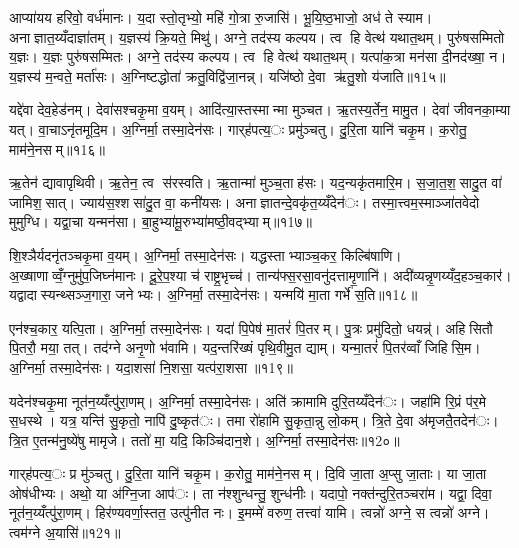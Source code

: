 आप्या॑यय हरिवो॒ वर्ध॑मानः। य॒दा स्तो॒तृभ्यो॒ महि॑ गो॒त्रा रु॒जासि॑। भू॒यि॒ष्ठ॒भाजो॒ अध॑ ते स्याम। अनाज्ञात॒य्यँदाज्ञा॑तम्। य॒ज्ञस्य॑ क्रि॒यते॒ मिथु॑। अग्ने॒ तद॑स्य कल्पय। त्व हि वेत्थ॑ यथात॒थम्। पुरु॑षसम्मितो य॒ज्ञः। य॒ज्ञः पुरु॑षसम्मितः। अग्ने॒ तद॑स्य कल्पय। त्व हि वेत्थ॑ यथात॒थम्। यत्पा॑क॒त्रा मन॑सा दी॒नद॑ख्षा॒ न। य॒ज्ञस्य॑ म॒न्वते॒ मर्ता॑सः। अ॒ग्निष्टद्धोता॑ क्रतु॒विद्वि॑जा॒नन्न्। यजि॑ष्ठो दे॒वा ऋ॑तु॒शो य॑जाति॥१1५॥


यद्दे॑वा देव॒हेड॑नम्। देवा॑सश्चकृ॒मा व॒यम्। आदि॑त्या॒स्तस्मान्मा मुञ्चत। ऋ॒तस्य॒र्तेन॒ मामु॒त। देवा॑ जीवनका॒म्या यत्। वा॒चाऽनृ॑तमूदि॒म। अ॒ग्निर्मा॒ तस्मा॒देन॑सः। गार्‌ह॑पत्य॒ः प्रमु॑ञ्चतु। दु॒रि॒ता यानि॑ चकृ॒म। क॒रोतु॒ माम॑ने॒नसम्॥१1६॥

ऋ॒तेन॑ द्यावापृथिवी। ऋ॒तेन॒ त्व स॑रस्वति। ऋ॒तान्मा॑ मुञ्च॒ताह॑सः। यद॒न्यकृ॑तमारि॒म। स॒जा॒त॒श॒सादु॒त वा॑ जामिश॒सात्। ज्याय॑स॒श्शसा॑दु॒त वा॒ कनी॑यसः। अनाज्ञातन्दे॒वकृ॑त॒य्यँदेन॑ः। तस्मा॒त्त्वम॒स्माञ्जा॑तवेदो मुमुग्धि। यद्वा॒चा यन्मन॑सा। बा॒हुभ्या॑मू॒रुभ्या॑मष्ठी॒वद्भ्याम्॥१1७॥

शि॒श्ञैर्यदनृ॑तञ्चकृ॒मा व॒यम्। अ॒ग्निर्मा॒ तस्मा॒देन॑सः। यद्धस्ताभ्याञ्च॒कर॒ किल्बि॑षाणि। अ॒ख्षाणाव्वँ॒ग्नुमु॑प॒जिघ्न॑मानः। दू॒रे॒प॒श्या च॑ राष्ट्र॒भृच्च॑। तान्य॑फ्स॒रसा॒वनु॑दत्तामृ॒णानि॑। अदी॑व्यन्नृ॒णय्यँद॒हञ्च॒कार॑। यद्वादास्यन्थ्सञ्ज॒गारा॒ जनेभ्यः। अ॒ग्निर्मा॒ तस्मा॒देन॑सः। यन्मयि॑ मा॒ता गर्भे॑ स॒ति॥१1८॥

एन॑श्च॒कार॒ यत्पि॒ता। अ॒ग्निर्मा॒ तस्मा॒देन॑सः। यदा॑ पि॒पेष॑ मा॒तरं॑ पि॒तरम्। पु॒त्रः प्रमु॑दितो॒ धयन्न्॑। अहिसितौ पि॒तरौ॒ मया॒ तत्। तद॑ग्ने अनृ॒णो भ॑वामि। यद॒न्तरि॑ख्षं पृथि॒वीमु॒त द्याम्। यन्मा॒तरं॑ पि॒तर॑व्वाँ जिहिसि॒म। अ॒ग्निर्मा॒ तस्मा॒देन॑सः। यदा॒शसा॑ नि॒शसा॒ यत्प॑रा॒शसा॥१1९॥

यदेन॑श्चकृ॒मा नूत॑न॒य्यँत्पु॑रा॒णम्। अ॒ग्निर्मा॒ तस्मा॒देन॑सः। अति॑ क्रामामि दुरि॒तय्यँदेन॑ः। जहा॑मि रि॒प्रं प॑र॒मे स॒धस्थे। यत्र॒ यन्ति॑ सु॒कृतो॒ नापि॑ दु॒ष्कृत॑ः। तमा रो॑हामि सु॒कृता॒न्नु लो॒कम्। त्रि॒ते दे॒वा अ॑मृजतै॒तदेन॑ः। त्रि॒त ए॒तन्म॑नु॒ष्ये॑षु मामृजे। ततो॑ मा॒ यदि॒ किञ्चि॑दान॒शे। अ॒ग्निर्मा॒ तस्मा॒देन॑सः॥१2०॥

गार्‌ह॑पत्य॒ः प्र मु॑ञ्चतु। दु॒रि॒ता यानि॑ चकृ॒म। क॒रोतु॒ माम॑ने॒नसम्। दि॒वि जा॒ता अ॒प्सु जा॒ताः। या जा॒ता ओष॑धीभ्यः। अथो॒ या अ॑ग्नि॒जा आप॑ः। ता न॑श्शुन्धन्तु॒ शुन्ध॑नीः। यदापो॒ नक्त॑न्दुरि॒तञ्चरा॑म। यद्वा॒ दिवा॒ नूत॑न॒य्यँत्पु॑रा॒णम्। हिर॑ण्यवर्णा॒स्तत॒ उत्पु॑नीत नः। इ॒मम्मे॑ वरुण॒ तत्त्वा॑ यामि। त्वन्नो॑ अग्ने॒ स त्वन्नो॑ अग्ने। त्वम॑ग्ने अ॒यासि॑॥१2१॥

